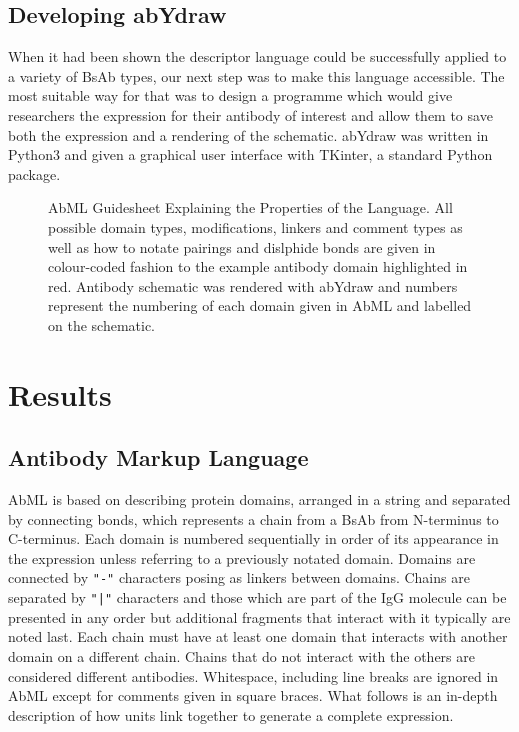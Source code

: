 \documentclass{article}
\begin{document}
\subsection{Developing abYdraw}
When it had been shown the descriptor language could be successfully
applied to a variety of  BsAb types, our next step was to make this
language accessible. The most suitable way for that was to design a
programme which would give researchers the expression for their
antibody of interest and allow them to save both the expression and a
rendering of the schematic. abYdraw was written in Python3 and given a
graphical user interface with TKinter, a standard Python package. 


\begin{figure}
\caption{\label{fig:1} AbML Guidesheet Explaining the Properties of
the Language. All possible domain types, modifications, linkers and
comment types as well as how to notate pairings and dislphide bonds
are given in colour-coded fashion to the example antibody domain
highlighted in red. Antibody schematic was rendered with abYdraw and
numbers represent the numbering of each domain given in AbML and
labelled on the schematic.}
\end{figure}

\section{Results}

\subsection{Antibody Markup Language}
AbML is based on describing protein domains, arranged in a string and
separated by connecting bonds, which represents a chain from a BsAb
from N-terminus to C-terminus. Each domain is numbered sequentially in
order of its appearance in the expression unless referring to a
previously notated domain. Domains are connected by \verb|"-"| characters
posing as linkers between domains. Chains are separated by \verb."|".
characters and those which are part of the IgG molecule can be
presented in any order but additional fragments that interact with it
typically are noted last. Each chain must have at least one domain
that interacts with another domain on a different chain. Chains that
do not interact with the others are considered different
antibodies. Whitespace, including line breaks are ignored in AbML
except for comments given in square braces. What follows is an
in-depth description of how units link together to generate a complete
expression. 
\end{document}
